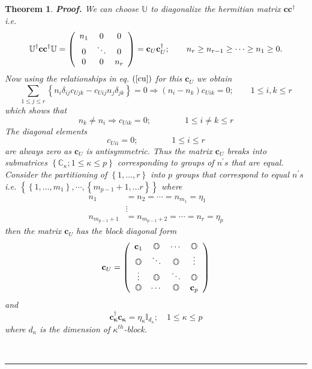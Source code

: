 \documentclass[aps,preprint]{revtex4}%
\newtheorem{theorem}{Theorem}
\newenvironment{proof}[1][Proof]{\noindent\textbf{#1.} }{\ \rule{0.5em}{0.5em}}
\begin{document}
\begin{theorem}
\begin{proof}
We can choose $\mathbb{U}$ to diagonalize the hermitian matrix $\mathbf{cc}%
^{\dagger}$ i.e.%
\begin{equation}
\mathbb{U}^{\dagger}\mathbf{cc}\mathbb{^{\dagger}U}=\left(
\begin{array}
[c]{ccc}%
n_{1} & 0 & 0\\
0 & \ddots & 0\\
0 & 0 & n_{r}%
\end{array}
\right)  =\mathbf{c}_{U}\mathbf{c}_{U}^{\dagger};\qquad n_{r}\geq n_{r-1}%
\geq\cdots\geq n_{1}\geq0.
\end{equation}
Now using the relationships in eq. $\left(  \ref{cu}\right)  $ for this
$\mathbf{c}_{U}$ we obtain%
\begin{equation}
\sum_{1\leq j\leq r}\left\{  n_{i}\delta_{ij}c_{Ujk}-c_{Uij}n_{j}\delta
_{jk}\right\}  =0\Rightarrow\left(  n_{i}-n_{k}\right)  c_{Uik}=0;\qquad1\leq
i,k\leq r \label{dub1}%
\end{equation}
which shows that
\begin{equation}
n_{k}\neq n_{i}\Rightarrow c_{Uik}=0;\qquad\qquad1\leq i\neq k\leq r
\end{equation}
The diagonal elements
\begin{equation}
c_{Uii}=0;\qquad\qquad1\leq i\leq r
\end{equation}
are always zero as $\mathbf{c}_{U}$ is antisymmetric. Thus the matrix
$\mathbf{c}_{U}$ breaks into submatrices $\left\{  \mathbb{C}_{\kappa}%
;1\leq\kappa\leq p\right\}  $ corresponding to groups of $n^{\prime}s$ that
are equal. Consider the partitioning of $\left\{  1,\ldots,r\right\}  $ into
$p$ groups that correspond to equal $n^{\prime}s$ i.e. $\left\{  \left\{
1,\ldots,m_{1}\right\}  ,\cdots,\left\{  m_{p-1}+1,\ldots r\right\}  \right\}
$ where
\begin{align}
n_{1}  &  =n_{2}=\cdots=n_{m_{1}}=\eta_{1}\nonumber\\
&  \vdots\nonumber\\
n_{m_{p-1}+1}  &  =n_{m_{p-1}+2}=\cdots=n_{r}=\eta_{p}%
\end{align}
then the matrix $\mathbf{c}_{U}$ has the block diagonal form
\begin{equation}
\mathbf{c}_{U}=\left(
\begin{array}
[c]{cccc}%
\mathbf{c}_{1} & \mathbb{O} & \cdots & \mathbb{O}\\
\mathbb{O} & \ddots & \mathbb{O} & \vdots\\
\vdots & \mathbb{O} & \ddots & \mathbb{O}\\
\mathbb{O} & \cdots & \mathbb{O} & \mathbf{c}_{p}%
\end{array}
\right)
\end{equation}
and
\begin{equation}
\mathbf{c_{\kappa}^{\dagger}c_{\kappa}}=\eta_{\kappa}\mathbb{I}_{d_{\kappa}%
};\quad1\leq\kappa\leq p \label{dub2}%
\end{equation}
where $d_{\kappa}$ is the dimension of $\kappa^{th}$-block.


\end{proof}
\end{theorem}
\end{document}
